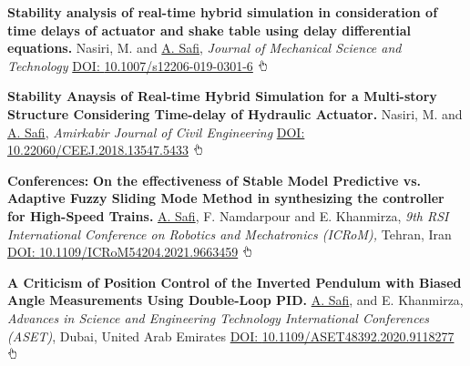 \documentclass[letterpaper,MMMyyyy]{CVTemplate}
\begin{document}
\begin{Body}
\Gap\vspace{6pt}
\BulletItem
\textbf{Stability analysis of real-time hybrid simulation in consideration of time delays of actuator and shake table using delay differential equations.}
Nasiri, M. and \underline{A. Safi},
\textit{Journal of Mechanical Science and Technology}
\newline
\href{https://link.springer.com/article/10.1007/s12206-019-0301-6}{DOI: \textcolor{Forestg}{10.1007/s12206-019-0301-6}} \includegraphics[height=9pt]{icons/hand-cursor.png}
\hfill
\textcolor{OrangeY}{}

\Gap\vspace{6pt}
\BulletItem
\textbf{Stability Anaysis of Real-time Hybrid Simulation for a Multi-story Structure Considering Time-delay of Hydraulic Actuator.}
Nasiri, M. and \underline{A. Safi},
\textit{Amirkabir Journal of Civil Engineering}
\newline
\href{https://ceej.aut.ac.ir/article_2911.html?lang=en}{DOI: \textcolor{Forestg}{10.22060/CEEJ.2018.13547.5433}} \includegraphics[height=9pt]{icons/hand-cursor.png}
\hfill
\textcolor{OrangeY}{}
\Gap
\endgroup


\begingroup
\BigGap
\textcolor{Forestg}{\textbf{Conferences:}}
\vspace{4pt}
\BulletItem
\textbf{On the effectiveness of Stable Model Predictive vs. Adaptive Fuzzy Sliding Mode Method in synthesizing the controller for High-Speed Trains.}
\underline{A. Safi}, F. Namdarpour and E. Khanmirza,
\textit{9th RSI International Conference on Robotics and Mechatronics (ICRoM),} Tehran, Iran
\newline
\href{https://ieeexplore.ieee.org/document/9663459}{DOI: \textcolor{Forestg}{10.1109/ICRoM54204.2021.9663459}}
\includegraphics[height=9pt]{icons/hand-cursor.png}
\hfill
\textcolor{OrangeY}{}


\Gap\vspace{6pt}
\BulletItem
\textbf{A Criticism of Position Control of the Inverted Pendulum with Biased Angle Measurements Using Double-Loop PID.}
\underline{A. Safi}, and E. Khanmirza,
\textit{Advances in Science and Engineering Technology International Conferences (ASET)}, Dubai, United Arab Emirates
\newline
\href{https://ieeexplore.ieee.org/document/9118277}{DOI: \textcolor{Forestg}{10.1109/ASET48392.2020.9118277}}
\includegraphics[height=9pt]{icons/hand-cursor.png}
\hfill
\textcolor{OrangeY}{}




\end{Body}
\end{document}
